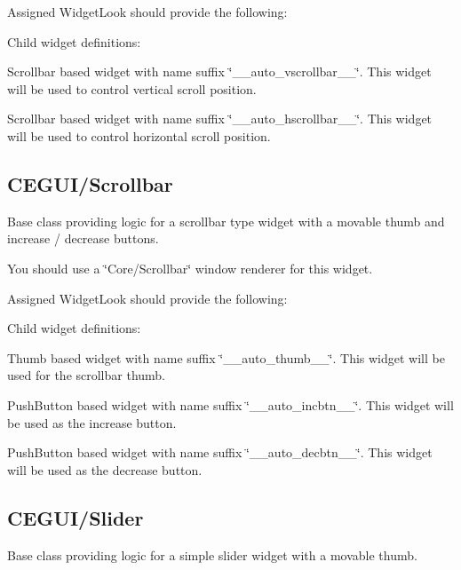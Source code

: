 Assigned Widget\+Look should provide the following\+: 
\begin{DoxyItemize}
\item Child widget definitions\+: 
\begin{DoxyItemize}
\item Scrollbar based widget with name suffix \char`\"{}\+\_\+\+\_\+auto\+\_\+vscrollbar\+\_\+\+\_\+\char`\"{}. This widget will be used to control vertical scroll position. 
\item Scrollbar based widget with name suffix \char`\"{}\+\_\+\+\_\+auto\+\_\+hscrollbar\+\_\+\+\_\+\char`\"{}. This widget will be used to control horizontal scroll position. 
\end{DoxyItemize}
\end{DoxyItemize}\hypertarget{fal_baseclass_ref_fal_baseclass_ref_sec_22}{}\subsection{C\+E\+G\+U\+I/\+Scrollbar}\label{fal_baseclass_ref_fal_baseclass_ref_sec_22}
Base class providing logic for a scrollbar type widget with a movable thumb and increase / decrease buttons.

You should use a \char`\"{}\+Core/\+Scrollbar\char`\"{} window renderer for this widget.

Assigned Widget\+Look should provide the following\+: 
\begin{DoxyItemize}
\item Child widget definitions\+: 
\begin{DoxyItemize}
\item Thumb based widget with name suffix \char`\"{}\+\_\+\+\_\+auto\+\_\+thumb\+\_\+\+\_\+\char`\"{}. This widget will be used for the scrollbar thumb. 
\item Push\+Button based widget with name suffix \char`\"{}\+\_\+\+\_\+auto\+\_\+incbtn\+\_\+\+\_\+\char`\"{}. This widget will be used as the increase button. 
\item Push\+Button based widget with name suffix \char`\"{}\+\_\+\+\_\+auto\+\_\+decbtn\+\_\+\+\_\+\char`\"{}. This widget will be used as the decrease button. 
\end{DoxyItemize}
\end{DoxyItemize}\hypertarget{fal_baseclass_ref_fal_baseclass_ref_sec_23}{}\subsection{C\+E\+G\+U\+I/\+Slider}\label{fal_baseclass_ref_fal_baseclass_ref_sec_23}
Base class providing logic for a simple slider widget with a movable thumb.

